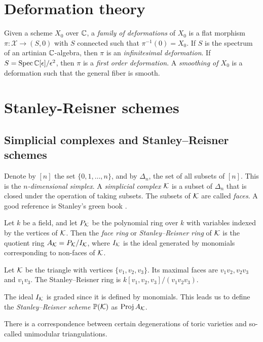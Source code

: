 \section{Deformation theory}

Given a scheme $X_0$ over $\mathbb{C}$, a \emph{family of deformations} of $X_0$ is a flat morphism $\pi:\mathscr X \to (S,0)$ with $S$ connected such that $\pi^{-1}(0)=X_0$. If $S$ is the spectrum of an artinian $\mathbb{C}$-algebra, then $\pi$ is an \emph{infinitesimal deformation}. If $S=\operatorname{Spec} \mathbb{C}[\epsilon]/\epsilon^2$, then  $\pi$ is a \emph{first order deformation}. A \emph{smoothing of $X_0$} is a deformation such that the general fiber is smooth.

\section{Stanley-Reisner schemes}

\subsection{Simplicial complexes and Stanley--Reisner schemes}

Denote by $[n]$ the set $\{0,1,\ldots,n\}$, and by $\Delta_n$, the set of all subsets of $[n]$. This is the \emph{$n$-dimensional simplex}. A \emph{simplicial complex} $\mathcal{K}$ is a subset of $\Delta_n$ that is closed under the operation of taking subsets. The subsets of $\mathcal{K}$ are called \emph{faces}. A good reference is Stanley's green book \cite{stanley_green}.

Let $k$ be a field, and let $P_{\mathcal{K}}$ be the polynomial ring over $k$ with variables indexed by the vertices of $\mathcal{K}$. Then the \emph{face ring} or \emph{Stanley--Reisner ring} of $\mathcal{K}$ is the quotient ring $A_{\mathcal{K}} = P_{\mathcal{K}}/I_{\mathcal{K}}$, where $I_{\mathcal{K}}$ is the ideal generated by monomials corresponding to non-faces of $\mathcal{K}$. 

\begin{example}
Let $\mathcal{K}$ be the triangle with vertices $\{ v_1,v_2,v_3\}$. Its maximal faces are $v_1v_2, v_2v_3$ and $v_1v_3$. The Stanley--Reisner ring is $k[v_1,v_2,v_3]/(v_1v_2v_3)$.
\end{example}

The ideal $I_{\mathcal{K}}$ is graded since it is defined by monomials. This leads us to define the \emph{Stanley--Reisner scheme} $\mathbb{P}(\mathcal{K})$ as $\operatorname{Proj} A_{\mathcal{K}}$. 

There is a correspondence between certain degenerations of toric varieties and so-called unimodular triangulations. 


